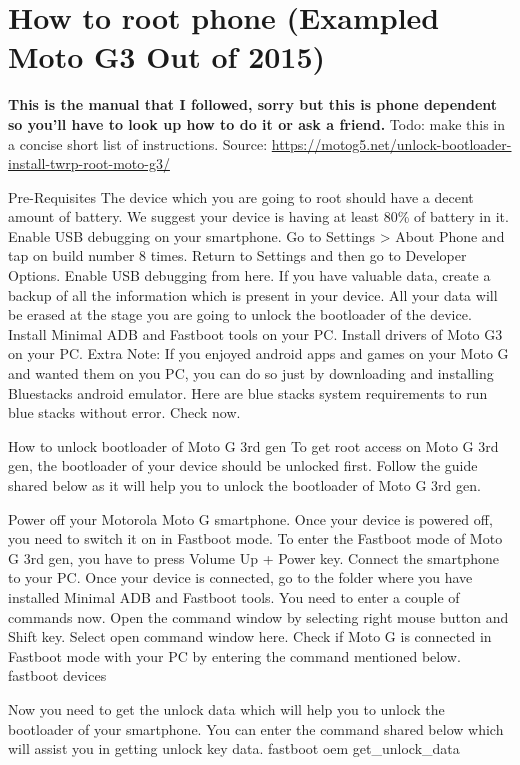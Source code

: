 \section{How to root phone (Exampled Moto G3 Out of 2015)}\label{sec:ch2}
\textbf{This is the manual that I followed, sorry but this is phone dependent so you'll have to look up how to do it or ask a friend.} Todo: make this in a concise short list of instructions.
Source: \url{https://motog5.net/unlock-bootloader-install-twrp-root-moto-g3/}

Pre-Requisites
The device which you are going to root should have a decent amount of battery. We suggest your device is having at least 80\% of battery in it.
Enable USB debugging on your smartphone. Go to Settings > About Phone and tap on build number 8 times. Return to Settings and then go to Developer Options. Enable USB debugging from here.
If you have valuable data, create a backup of all the information which is present in your device. All your data will be erased at the stage you are going to unlock the bootloader of the device.
Install Minimal ADB and Fastboot tools on your PC.
Install drivers of Moto G3 on your PC.
Extra Note: If you enjoyed android apps and games on your Moto G and wanted them on you PC, you can do so just by downloading and installing Bluestacks android emulator. Here are blue stacks system requirements to run blue stacks without error. Check now.

How to unlock bootloader of Moto G 3rd gen
To get root access on Moto G 3rd gen, the bootloader of your device should be unlocked first. Follow the guide shared below as it will help you to unlock the bootloader of Moto G 3rd gen.

Power off your Motorola Moto G smartphone. Once your device is powered off, you need to switch it on in Fastboot mode. To enter the Fastboot mode of Moto G 3rd gen, you have to press Volume Up + Power key.
Connect the smartphone to your PC. Once your device is connected, go to the folder  where you have installed Minimal ADB and Fastboot tools. You need to enter a couple of commands now. Open the command window by selecting right mouse button and Shift key. Select open command window here.
Check if Moto G is connected in Fastboot mode with your PC by entering the command mentioned below.
fastboot devices

Now you need to get the unlock data which will help you to unlock the bootloader of your smartphone. You can enter the command shared below which will assist you in getting unlock key data.
fastboot oem get\_unlock\_data

